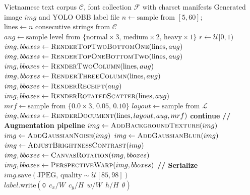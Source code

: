 \begin{algorithm}[H]
\scriptsize
\caption{Data Generation Pipeline for a Single Detection Image}
\label{alg:detection_data_generation}
\begin{algorithmic}[1]
\Require Vietnamese text corpus $\mathcal{C}$, font collection $\mathcal{F}$ with charset manifests
\Ensure Generated image $img$ and YOLO OBB label file
    \State $n \gets \text{sample from } [5, 60]$; \quad $\text{lines} \gets n \text{ consecutive strings from } \mathcal{C}$
    \State $aug \gets \text{sample level from } \{\text{normal} \times 3,\, \text{medium} \times 2,\, \text{heavy} \times 1\}$
    \State $r \gets \mathcal{U}[0, 1)$
     $img, bboxes \gets \textsc{RenderTopTwoBottomOne}(\text{lines}, aug)$
     $img, bboxes \gets \textsc{RenderTopOneBottomTwo}(\text{lines}, aug)$
     $img, bboxes \gets \textsc{RenderTwoColumn}(\text{lines}, aug)$
     $img, bboxes \gets \textsc{RenderThreeColumn}(\text{lines}, aug)$
     $img, bboxes \gets \textsc{RenderReceipt}(aug)$
     $img, bboxes \gets \textsc{RenderRotatedScatter}(\text{lines}, aug)$
    \Else
        \State $mrf \gets \text{sample from } \{0.0 \times 3,\, 0.05,\, 0.10\}$
        \State $layout \gets \text{sample from } \mathcal{L}$
        \State $img, bboxes \gets \textsc{RenderDocument}(\text{lines}, layout, aug, mrf)$
    \EndIf
     \textbf{continue} \EndIf
    \State \textbf{// Augmentation pipeline}
        $img \gets \textsc{AddBackgroundTexture}(img)$
    \EndIf
     $img \gets \textsc{AddGaussianNoise}(img)$ \EndIf
     $img \gets \textsc{AddGaussianBlur}(img)$ \EndIf
     $img \gets \textsc{AdjustBrightnessContrast}(img)$ \EndIf
        \State $img, bboxes \gets \textsc{CanvasRotation}(img, bboxes)$
    \EndIf
        \State $img, bboxes \gets \textsc{PerspectiveWarp}(img, bboxes)$
    \EndIf
    \State \textbf{// Serialize}
    \State $img.\text{save}(\text{JPEG, quality} \sim \mathcal{U}[85, 98])$
        \State $label.\text{write}(\texttt{0}\ \ c_x/W\ \ c_y/H\ \ w/W\ \ h/H\ \ \theta)$
        \Comment{$\theta \in [0^\circ, 360^\circ)$, CCW}
    \EndFor
\EndFor
\end{algorithmic}
\end{algorithm}

